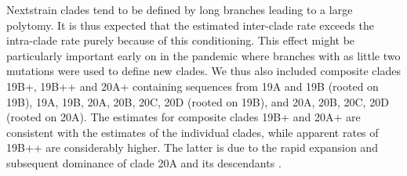 \documentclass[aps,rmp, twocolumn]{revtex4}
\begin{document}
Nextstrain clades tend to be defined by long branches leading to a large polytomy.
It is thus expected that the estimated inter-clade rate exceeds the intra-clade rate purely because of this conditioning.
This effect might be particularly important early on in the pandemic where branches with as little two mutations were used to define new clades.
We thus also included composite clades 19B+, 19B++ and 20A+ containing sequences from 19A and 19B (rooted on 19B), 19A, 19B, 20A, 20B, 20C, 20D (rooted on 19B), and 20A, 20B, 20C, 20D (rooted on 20A).
The estimates for composite clades 19B+ and 20A+ are consistent with the estimates of the individual clades, while apparent rates of 19B++ are considerably higher.
The latter is due to the rapid expansion and subsequent dominance of clade 20A and its descendants \citep{korber_tracking_2020}.
\end{document}

